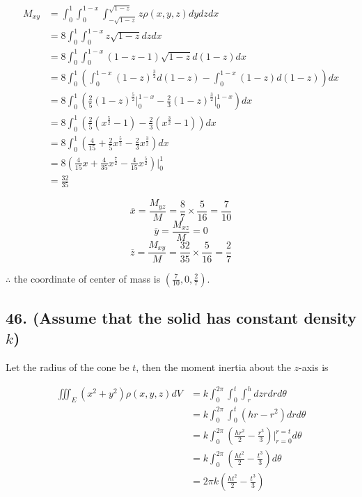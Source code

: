 \documentclass{article}
\begin{document}
  $$\begin{aligned}
    M_{xy} &= \int_0^1 \int_0^{1-x} \int_{-\sqrt{1-z}}^{\sqrt{1-z}} z \rho(x, y, z) dy dz dx \\
    &= 8\int_0^1 \int_0^{1-x} z\sqrt{1-z} dz dx \\
    &= 8\int_0^1 \int_0^{1-x} (1-z-1)\sqrt{1-z} d(1-z) dx \\
    &= 8\int_0^1 (\int_0^{1-x} (1-z)^{\frac 3 2} d(1-z) - \int_0^{1-x} (1-z)d(1-z)) dx \\
    &= 8\int_0^1 (\frac 2 5 (1-z)^{\frac 5 2} \biggl|_0^{1-x} - \frac 2 3 (1-z)^{\frac 3 2}\biggl|_0^{1-x}) dx \\
    &= 8\int_0^1 (\frac 2 5(x^{\frac 5 2} - 1) - \frac 2 3(x^{\frac 3 2} - 1)) dx \\
    &= 8\int_0^1 (\frac{4}{15} + \frac 2 5 x^{\frac 5 2} - \frac 2 3 x^{\frac 3 2}) dx \\
    &= 8(\frac{4}{15}x + \frac{4}{35}x^{\frac 7 2} - \frac{4}{15}x^{\frac 5 2})\biggl|_0^1 \\
    &= \frac{32}{35}
  \end{aligned}$$

  $$\overline{x} = \frac{M_{yz}}{M} = \frac{8}{7} \times \frac{5}{16} = \frac{7}{10}$$
  $$\overline{y} = \frac{M_{xz}}{M} = 0$$
  $$\overline{z} = \frac{M_{xy}}{M} = \frac{32}{35} \times \frac{5}{16} = \frac{2}{7}$$

  $\therefore$ the coordinate of center of mass is $(\frac{7}{10} , 0, \frac 2 7)$.

  \subsection*{46. (Assume that the solid has constant density $k$)}

  Let the radius of the cone be $t$, then the moment inertia about the $z$-axis is

  $$\begin{aligned}
    \iiint_E (x^2+y^2) \rho(x, y, z) dV &= k\int_0^{2\pi} \int_0^t \int_r^h dz r dr d\theta \\
    &= k\int_0^{2\pi} \int_0^t (hr-r^2) dr d\theta \\
    &= k\int_0^{2\pi} (\frac{hr^2}{2} - \frac{r^3}{3})\biggl|_{r=0}^{r=t} d\theta \\
    &= k\int_0^{2\pi} (\frac{ht^2}{2} - \frac{t^3}{3}) d\theta \\
    &= 2\pi k (\frac{ht^2}{2} - \frac{t^3}{3})
  \end{aligned}$$
\end{document}

